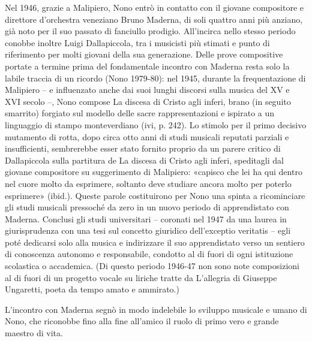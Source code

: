 Nel 1946, grazie a Malipiero, Nono entrò in contatto con il giovane compositore e direttore d’orchestra veneziano Bruno Maderna, di soli quattro anni più anziano, già noto per il suo passato di fanciullo prodigio. All’incirca nello stesso periodo conobbe inoltre Luigi Dallapiccola, tra i musicisti più stimati e punto di riferimento per molti giovani della sua generazione. Delle prove compositive portate a termine prima del fondamentale incontro con Maderna resta solo la labile traccia di un ricordo (Nono 1979-80): nel 1945, durante la frequentazione di Malipiero – e influenzato anche dai suoi lunghi discorsi sulla musica del XV e XVI secolo –, Nono compose La discesa di Cristo agli inferi, brano (in seguito smarrito) forgiato sul modello delle sacre rappresentazioni e ispirato a un linguaggio di stampo monteverdiano (ivi, p. 242). Lo stimolo per il primo decisivo mutamento di rotta, dopo circa otto anni di studi musicali reputati parziali e insufficienti, sembrerebbe esser stato fornito proprio da un parere critico di Dallapiccola sulla partitura de La discesa di Cristo agli inferi, speditagli dal giovane compositore su suggerimento di Malipiero: «capisco che lei ha qui dentro nel cuore molto da esprimere, soltanto deve studiare ancora molto per poterlo esprimere» (ibid.). Queste parole costituirono per Nono una spinta a ricominciare gli studi musicali pressoché da zero in un nuovo periodo di apprendistato con Maderna. Conclusi gli studi universitari – coronati nel 1947 da una laurea in giurisprudenza con una tesi sul concetto giuridico dell’exceptio veritatis – egli poté dedicarsi solo alla musica e indirizzare il suo apprendistato verso un sentiero di conoscenza autonomo e responsabile, condotto al di fuori di ogni istituzione scolastica o accademica. (Di questo periodo 1946-47 non sono note composizioni al di fuori di un progetto vocale su liriche tratte da L’allegria di Giuseppe Ungaretti, poeta da tempo amato e ammirato.)

L’incontro con Maderna segnò in modo indelebile lo sviluppo musicale e umano di Nono, che riconobbe fino alla fine all’amico il ruolo di primo vero e grande maestro di vita.

